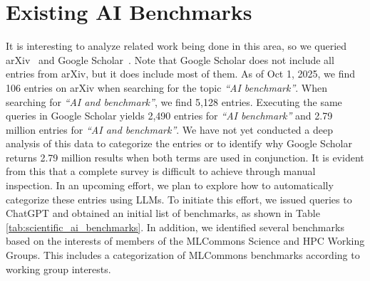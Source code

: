 \section{Existing AI Benchmarks}
\label{sec:benchmarks}



It is interesting to analyze related work being done in this area, so we queried arXiv~\cite{www-arXiv} and Google Scholar~\cite{www-google-scholar}. Note that Google Scholar does not include all entries from arXiv, but it does include most of them.
As of Oct 1, 2025, we find 106 entries on arXiv when searching for the topic {\em ``AI benchmark''}.
When searching for {\em ``AI and benchmark''}, we find 5,128 entries. Executing the same queries in Google Scholar yields 2,490 entries for {\em ``AI benchmark''} and
2.79 million entries for {\em ``AI and benchmark''}.
We have not yet conducted a deep analysis of this data to categorize the entries or to identify why Google Scholar returns 2.79 million results when both terms are used in conjunction.
It is evident from this that a complete survey is difficult to achieve through manual inspection. In an upcoming effort, we plan to explore how to automatically categorize these entries using LLMs.
To initiate this effort, we issued queries to ChatGPT and obtained an initial list of benchmarks, as shown in Table \ref{tab:scientific_ai_benchmarks}. In addition, we identified several benchmarks based on the interests of members of the MLCommons Science and HPC Working Groups. This includes a categorization of MLCommons benchmarks according to working group interests. 

